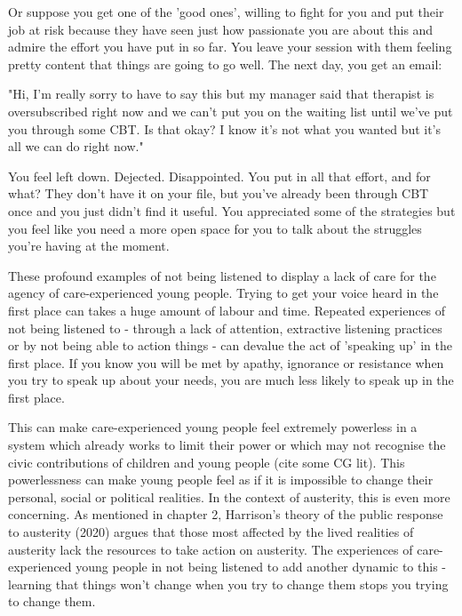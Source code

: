 Or suppose you get one of the 'good ones', willing to fight for you and put their job at risk because they have seen just how passionate you are about this and admire the effort you have put in so far. You leave your session with them feeling pretty content that things are going to go well. The next day, you get an email:

"Hi, I'm really sorry to have to say this but my manager said that therapist is oversubscribed right now and we can't put you on the waiting list until we've put you through some CBT. Is that okay? I know it's not what you wanted but it's all we can do right now."

You feel left down. Dejected. Disappointed. You put in all that effort, and for what? They don't have it on your file, but you've already been through CBT once and you just didn't find it useful. You appreciated some of the strategies but you feel like you need a more open space for you to talk about the struggles you're having at the moment.

These profound examples of not being listened to display a lack of care for the agency of care-experienced young people. Trying to get your voice heard in the first place can takes a huge amount of labour and time. Repeated experiences of not being listened to - through a lack of attention, extractive listening practices or by not being able to action things - can devalue the act of 'speaking up' in the first place. If you know you will be met by apathy, ignorance or resistance when you try to speak up about your needs, you are much less likely to speak up in the first place.

This can make care-experienced young people feel extremely powerless in a system which already works to limit their power or which may not recognise the civic contributions of children and young people (cite some CG lit). This powerlessness can make young people feel as if it is impossible to change their personal, social or political realities. In the context of austerity, this is even more concerning. As mentioned in chapter 2, Harrison's theory of the public response to austerity (2020) argues that those most affected by the lived realities of austerity lack the resources to take action on austerity. The experiences of care-experienced young people in not being listened to add another dynamic to this - learning that things won't change when you try to change them stops you trying to change them.


